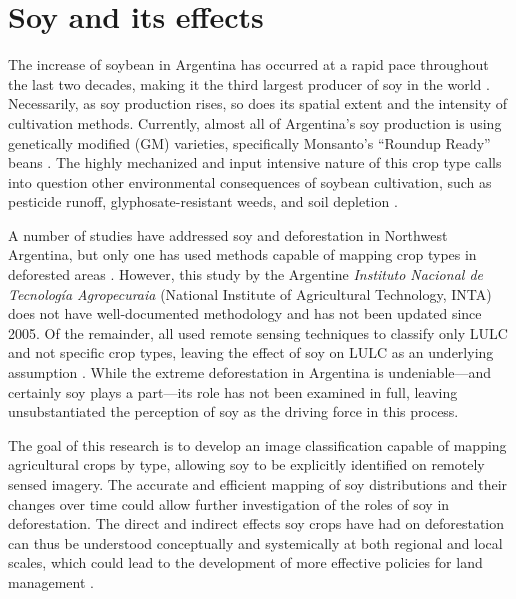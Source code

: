 \section{Soy and its effects}

The increase of soybean in Argentina has occurred at a rapid pace throughout the last two decades, making it the third largest producer of soy in the world \autocite{us-foreign-agri2013world}. Necessarily, as soy production rises, so does its spatial extent and the intensity of cultivation methods. Currently, almost all of Argentina’s soy production is using genetically modified (GM) varieties, specifically Monsanto’s “Roundup Ready” beans \autocite{greenpeace-inte2005the-expanding}. The highly mechanized and input intensive nature of this crop type calls into question other environmental consequences of soybean cultivation, such as pesticide runoff, glyphosate-resistant weeds, and soil depletion \autocite{pengue2005transgenic}.

A number of studies have addressed soy and deforestation in Northwest Argentina, but only one has used methods capable of mapping crop types in deforested areas \autocite{volante2005analisis}. However, this study by the Argentine \textit{Instituto Nacional de Tecnología Agropecuraia} (National Institute of Agricultural Technology, INTA) does not have well-documented methodology and has not been updated since 2005. Of the remainder, all used remote sensing techniques to classify only LULC and not specific crop types, leaving the effect of soy on LULC as an underlying assumption \autocites{grau2005agriculture}
{grau2008balancing}{grau2005globalization}
{boletta2006assessing}{gasparri2009deforestation}. While the extreme deforestation in Argentina is undeniable---and certainly soy plays a part---its role has not been examined in full, leaving unsubstantiated the perception of soy as the driving force in this process.

The goal of this research is to develop an image classification capable of mapping agricultural crops by type, allowing soy to be explicitly identified on remotely sensed imagery. The accurate and efficient mapping of soy distributions and their changes over time could allow further investigation of the roles of soy in deforestation. The direct and indirect effects soy crops have had on deforestation can thus be understood conceptually and systemically at both regional and local scales, which could lead to the development of more effective policies for land management \autocite{brown2007multitemporal}.


